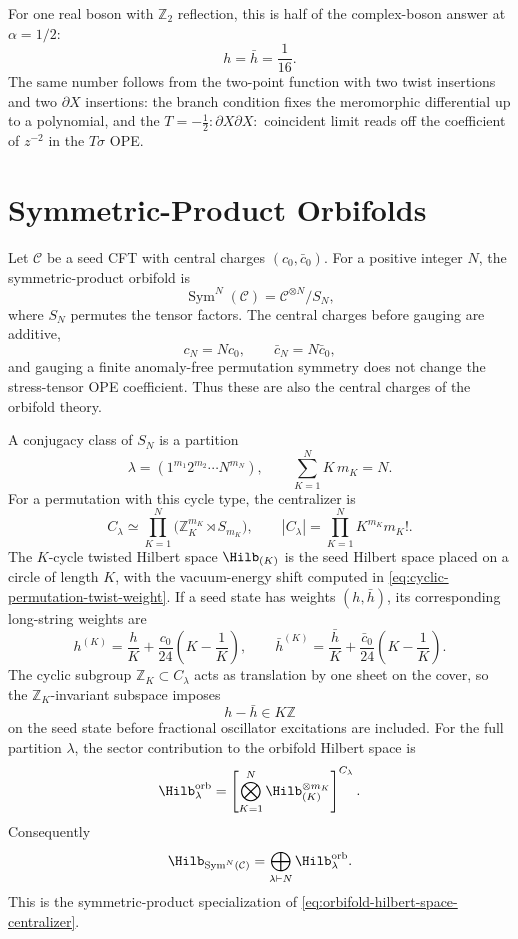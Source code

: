 For one real boson with \(\mathbb Z_2\) reflection, this is half of the
complex-boson answer at \(\alpha=1/2\):
\[
  h=\bar h=\frac1{16}.
\]
The same number follows from the two-point function with two twist insertions
and two \(\partial X\) insertions: the branch condition fixes the meromorphic
differential up to a polynomial, and the \(T=-\frac12:\partial X\partial X:\)
coincident limit reads off the coefficient of \(z^{-2}\) in the \(T\sigma\)
OPE.

\section{Symmetric-Product Orbifolds}
\label{sec:symmetric-product-orbifolds}

Let \(\mathcal C\) be a seed CFT with central charges
\((c_0,\bar c_0)\).  For a positive integer \(N\), the symmetric-product
orbifold is
\[
  \operatorname{Sym}^N(\mathcal C)
  =
  \mathcal C^{\otimes N}/S_N,
\]
where \(S_N\) permutes the tensor factors.  The central charges before
gauging are additive,
\[
  c_N=Nc_0,\qquad \bar c_N=N\bar c_0,
\]
and gauging a finite anomaly-free permutation symmetry does not change the
stress-tensor OPE coefficient.  Thus these are also the central charges of
the orbifold theory.

A conjugacy class of \(S_N\) is a partition
\[
  \lambda=(1^{m_1}2^{m_2}\cdots N^{m_N}),
  \qquad
  \sum_{K=1}^N K\,m_K=N .
\]
For a permutation with this cycle type, the centralizer is
\begin{equation}
  C_\lambda
  \simeq
  \prod_{K=1}^N\bigl(\mathbb Z_K^{m_K}\rtimes S_{m_K}\bigr),
  \qquad
  |C_\lambda|
  =
  \prod_{K=1}^N K^{m_K}m_K! .
  \label{eq:symmetric-product-centralizer}
\end{equation}
The \(K\)-cycle twisted Hilbert space \(\Hilb_{(K)}\) is the seed Hilbert
space placed on a circle of length \(K\), with the vacuum-energy shift
computed in \eqref{eq:cyclic-permutation-twist-weight}.  If a
seed state has weights \((h,\bar h)\), its corresponding long-string weights
are
\begin{equation}
  h^{(K)}=\frac{h}{K}+\frac{c_0}{24}\left(K-\frac1K\right),
  \qquad
  \bar h^{(K)}=\frac{\bar h}{K}
  +\frac{\bar c_0}{24}\left(K-\frac1K\right).
  \label{eq:symmetric-product-long-string-weights}
\end{equation}
The cyclic subgroup \(\mathbb Z_K\subset C_\lambda\) acts as translation by
one sheet on the cover, so the \(\mathbb Z_K\)-invariant subspace imposes
\[
  h-\bar h\in K\mathbb Z
\]
on the seed state before fractional oscillator excitations are included.
For the full partition \(\lambda\), the sector contribution to the orbifold
Hilbert space is
\begin{equation}
  \Hilb_\lambda^{\mathrm{orb}}
  =
  \left[
    \bigotimes_{K=1}^N
    \Hilb_{(K)}^{\otimes m_K}
  \right]^{C_\lambda}.
  \label{eq:symmetric-product-sector-hilbert-space}
\end{equation}
Consequently
\[
  \Hilb_{\operatorname{Sym}^N(\mathcal C)}
  =
  \bigoplus_{\lambda\vdash N}\Hilb_\lambda^{\mathrm{orb}} .
\]
This is the symmetric-product specialization of
\eqref{eq:orbifold-hilbert-space-centralizer}.

